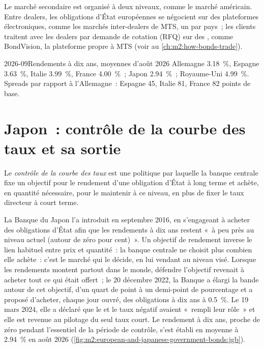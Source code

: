 Le marché secondaire est organisé à deux niveaux, comme le marché américain. Entre dealers,
les obligations d'État européennes se négocient sur des plateformes électroniques, comme les
marchés inter-dealers de MTS, un par pays~; les clients traitent avec les dealers par
demande de cotation (RFQ) sur des , comme BondVision, la plateforme propre à MTS
(voir au \cref{ch:m2:how-bonds-trade}).

\begin{dated}{2026-09}{Rendements à dix ans, moyennes d'août 2026}\label{dat:m2:european-and-japanese-government-bonds:yields}
Allemagne 3.18~\%, Espagne 3.63~\%, Italie 3.99~\%, France 4.00~\%~; Japon 2.94~\%~;
Royaume-Uni 4.99~\%. Spreads par rapport à l'Allemagne~: Espagne 45, Italie 81, France 82 points de base.
\end{dated}

\section{Japon~: contrôle de la courbe des taux et sa sortie}

\begin{definition}\label{def:m2:european-and-japanese-government-bonds:ycc}
Le \emph{contrôle de la courbe des taux} est une politique par laquelle la
banque centrale fixe un objectif pour le rendement d'une obligation d'État à long terme et achète, en
quantité nécessaire, pour le maintenir à ce niveau, en plus de fixer le taux
directeur à court terme.
\end{definition}

La Banque du Japon l'a introduit en septembre 2016, en s'engageant à acheter
des obligations d'État afin que les rendements à dix ans restent «~à peu près au
niveau actuel (autour de zéro pour cent)~». Un objectif de rendement inverse le
lien habituel entre prix et quantité~: la banque centrale ne choisit plus combien
elle achète~: c'est le marché qui le décide, en lui vendant au niveau visé. Lorsque les rendements
montent partout dans le monde, défendre l'objectif revenait à acheter tout ce qui était offert~; le
20 décembre 2022, la Banque a élargi la bande autour de cet objectif, d'un quart de point
à un demi-point de pourcentage et a proposé d'acheter, chaque jour ouvré, des obligations à dix ans à 0.5~\%.
Le 19 mars 2024, elle a déclaré que le  et le
taux négatif avaient «~rempli leur rôle~» et elle est revenue au pilotage du seul
taux court. Le rendement à dix ans, proche de zéro pendant l'essentiel de la période de contrôle,
s'est établi en moyenne à 2.94~\% en août 2026 (\cref{fig:m2:european-and-japanese-government-bonds:jgb}).

